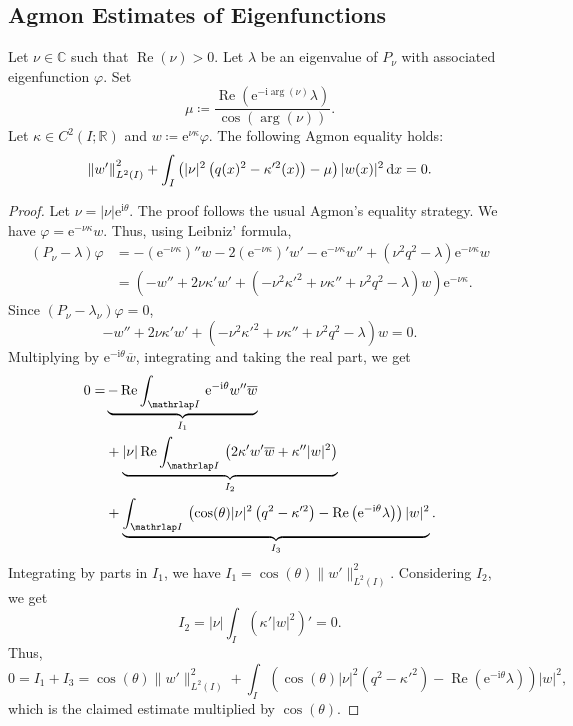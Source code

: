 \documentclass[10pt]{amsart}
\theoremstyle{definition}\newtheorem{defi}[theo]{Definition}\newtheorem{rema}[theo]{Remark}\newtheorem{exam}[theo]{Example}\newtheorem{exem}[theo]{Example}\newtheorem{nota}[theo]{Notation}
\newcommand{\1}{\mathds 1}
\DeclareMathOperator{\Ree}{Re}
\newcommand{\R}{\mathbb{R}}
\newcommand{\C}{\mathbb{C}}
\newcommand{\diff}[1][-3]{\ensuremath{\mathop{}\mkern#1mu\mathrm{d}}}
\newcommand{\eu}{\mathrm e}
\newcommand{\iu}{\mathrm i}
\renewcommand{\th}{\theta}
\renewcommand{\l}{\lambda}
\newcommand{\f}{\varphi}
\begin{document}
\subsection{Agmon Estimates of Eigenfunctions}\label{sec-agmon}

\begin{prop}\label{th:agmon-eq}
Let $\nu \in \C$ such that $\Ree(\nu)>0$. Let $\l$ be an eigenvalue of $P_\nu$ with associated eigenfunction $\f$. Set
\[
\mu\coloneqq \frac{\Ree\left(\eu^{-\iu\arg(\nu)}\lambda\right)}{\cos(\arg(\nu))}.
\]
Let $\kappa \in C^2(I;\R) $ and $w \coloneqq \eu^{\nu \kappa}\f$. The following Agmon equality holds:
\[
\left\|w'\right\|_{L^2(I)}^2 + \int_I \left(|\nu|^2\left(q(x)^2 - \kappa'^2(x)\right) - \mu\right)|w(x)|^2 \diff x = 0.
\]
\end{prop}

\begin{proof}
Let $\nu = |\nu|\eu^{\iu\th}$. The proof follows the usual Agmon's equality strategy. We have $\f = \eu^{-\nu \kappa} w$. Thus, using Leibniz' formula,
\begin{align*}
(P_\nu - \l) \f &=-\left(\eu^{-\nu \kappa}\right)'' w - 2\left(\eu^{-\nu \kappa}\right)' w' - \eu^{-\nu \kappa} w'' +\left(\nu^2 q^2-\l\right) \eu^{-\nu \kappa} w\\
&=\left(-w'' +2\nu \kappa' w' +\left(-\nu^2 \kappa'^2 +\nu \kappa'' +\nu^2 q^2 - \l\right)w \right)\eu^{-\nu \kappa}.
\end{align*}
Since $(P_\nu - \l_\nu)\f = 0$,
\begin{equation}
-w'' +2\nu \kappa' w' +\left(-\nu^2 \kappa'^2 +\nu \kappa'' +\nu^2 q^2 - \l\right)w = 0.
\end{equation}
Multiplying by $\eu^{-\iu\th}\overline{w}$, integrating and taking the real part, we get
\begin{align*}
0=& \underbrace{-\Ree\int_{\mathrlap I}\, \eu^{-\iu\th}w'' \overline{w}}_{I_1}\\
&+\underbrace{|\nu|\Ree\int_{\mathrlap I}\, \left(2\kappa'w' \overline{w} + \kappa''|w|^2\right)}_{I_2}\\
&+\underbrace{\int_{\mathrlap I}\,\left(\cos(\th)|\nu|^2\left(q^2-\kappa'^2\right) - \Ree\left(\eu^{-\iu\th}\l\right)\right) |w|^2}_{I_3}.
\end{align*}
Integrating by parts in $I_1$, we have $I_1 = \cos(\th) \|w'\|_{L^2(I)}^2$. Considering $I_2$, we get
\begin{equation*}
I_2 =|\nu|\int_I\left(\kappa'|w|^2\right)' =0.
\end{equation*}
Thus,
\[
0 = I_1 + I_3 =\cos(\th)\|w'\|^2_{L^2(I)} + \int_I\left(\cos(\th)|\nu|^2\left(q^2-\kappa'^2\right) - \Ree\left(\eu^{-\iu\th}\l\right)\right) |w|^2,
\]
which is the claimed estimate multiplied by $\cos(\th)$.
\end{proof}
\end{document}
